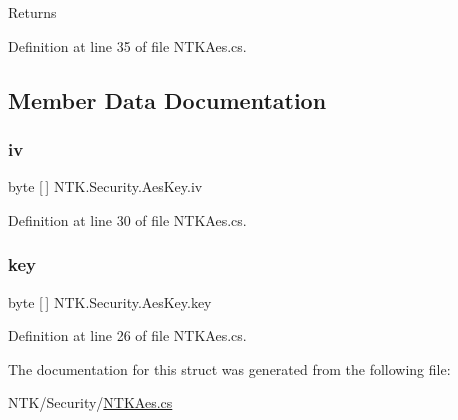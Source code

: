 \begin{DoxyReturn}{Returns}

\end{DoxyReturn}


Definition at line 35 of file N\+T\+K\+Aes.\+cs.



\subsection{Member Data Documentation}
\mbox{\label{struct_n_t_k_1_1_security_1_1_aes_key_ab37083abd6cd0f9e5e6fcc676935f12f}} 
\subsubsection{\texorpdfstring{iv}{iv}}
{\footnotesize\ttfamily byte \mbox{[}$\,$\mbox{]} N\+T\+K.\+Security.\+Aes\+Key.\+iv}







Definition at line 30 of file N\+T\+K\+Aes.\+cs.

\mbox{\label{struct_n_t_k_1_1_security_1_1_aes_key_a6d35e9fbba94bf3fc2e2b0f11ed0b07d}} 
\subsubsection{\texorpdfstring{key}{key}}
{\footnotesize\ttfamily byte \mbox{[}$\,$\mbox{]} N\+T\+K.\+Security.\+Aes\+Key.\+key}







Definition at line 26 of file N\+T\+K\+Aes.\+cs.



The documentation for this struct was generated from the following file\+:\begin{DoxyCompactItemize}
\item 
N\+T\+K/\+Security/\mbox{\hyperlink{_n_t_k_aes_8cs}{N\+T\+K\+Aes.\+cs}}\end{DoxyCompactItemize}
